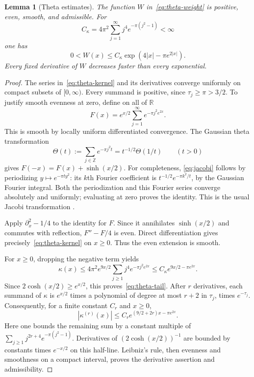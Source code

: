 \documentclass[11pt]{article}
\newtheorem{lemma}[theorem]{Lemma}
\theoremstyle{definition}
\theoremstyle{remark}
\newcommand{\R}{\mathbb R}
\begin{document}
\begin{lemma}[Theta estimates]\label{lem:theta}
The function $W$ in~\eqref{eq:theta-weight} is positive, even, smooth, and
admissible. For
\[
 C_\kappa=4\pi^2\sum_{j=1}^\infty j^4e^{-\pi(j^2-1)}<\infty
\]
one has
\begin{equation}\label{eq:theta-tail}
 0<W(x)\le C_\kappa\exp(4|x|-\pi e^{2|x|}).
\end{equation}
Every fixed derivative of $W$ decreases faster than every exponential.
\end{lemma}
\begin{proof}
The series in~\eqref{eq:theta-kernel} and its derivatives converge
uniformly on compact subsets of $[0,\infty)$. Every summand is positive,
since $\tau_j\ge\pi>3/2$. To justify smooth evenness at zero, define on
all of $\R$
\[
 F(x)=e^{x/2}\sum_{j=1}^\infty e^{-\pi j^2e^{2x}}.
\]
This is smooth by locally uniform differentiated convergence. The Gaussian
theta transformation
\begin{equation}\label{eq:jacobi}
 \Theta(t):=\sum_{j\in\mathbb Z}e^{-\pi j^2t}
 =t^{-1/2}\Theta(1/t)\qquad(t>0)
\end{equation}
gives $F(-x)=F(x)+\sinh(x/2)$. For completeness,
\eqref{eq:jacobi} follows by periodizing $y\mapsto e^{-\pi t y^2}$:
its $k$th Fourier coefficient is
$t^{-1/2}e^{-\pi k^2/t}$, by the Gaussian Fourier integral. Both the
periodization and this Fourier series converge absolutely and uniformly;
evaluating at zero proves the identity. This is the usual Jacobi
transformation \cite[Eq.~20.7.32]{DLMF}.

Apply $\partial_x^2-1/4$ to the identity for $F$. Since it annihilates
$\sinh(x/2)$ and commutes with reflection, $F''-F/4$ is even. Direct
differentiation gives precisely~\eqref{eq:theta-kernel} on $x\ge0$.
Thus the even extension is smooth.

For $x\ge0$, dropping the negative term yields
\[
 \kappa(x)\le4\pi^2e^{9x/2}\sum_{j\ge1}j^4e^{-\pi j^2e^{2x}}
 \le C_\kappa e^{9x/2-\pi e^{2x}}.
\]
Since $2\cosh(x/2)\ge e^{x/2}$, this proves~\eqref{eq:theta-tail}.
After $r$ derivatives, each summand of $\kappa$ is $e^{x/2}$ times a
polynomial of degree at most $r+2$ in $\tau_j$, times $e^{-\tau_j}$.
Consequently, for a finite constant $C_r$ and $x\ge0$,
\[
 |\kappa^{(r)}(x)|\le C_r e^{(9/2+2r)x-\pi e^{2x}}.
\]
Here one bounds the remaining sum by a constant multiple of
$\sum_{j\ge1}j^{2r+4}e^{-\pi(j^2-1)}$. Derivatives of
$(2\cosh(x/2))^{-1}$ are bounded by constants times $e^{-x/2}$ on this
half-line. Leibniz's rule, then evenness and smoothness on a compact
interval, proves the derivative assertion and admissibility.
\end{proof}
\end{document}
